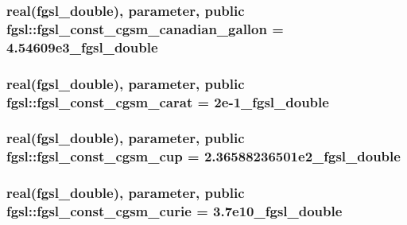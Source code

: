 \subsubsection[{fgsl\+\_\+const\+\_\+cgsm\+\_\+canadian\+\_\+gallon}]{\setlength{\rightskip}{0pt plus 5cm}real({\bf fgsl\+\_\+double}), parameter, public fgsl\+::fgsl\+\_\+const\+\_\+cgsm\+\_\+canadian\+\_\+gallon = 4.\+54609e3\+\_\+fgsl\+\_\+double}\label{namespacefgsl_a3a07299d97f40e47785e44126a457907}
\hypertarget{namespacefgsl_a239136f12feacdcaf3bc528ccb0c492f}{}
\subsubsection[{fgsl\+\_\+const\+\_\+cgsm\+\_\+carat}]{\setlength{\rightskip}{0pt plus 5cm}real({\bf fgsl\+\_\+double}), parameter, public fgsl\+::fgsl\+\_\+const\+\_\+cgsm\+\_\+carat = 2e-\/1\+\_\+fgsl\+\_\+double}\label{namespacefgsl_a239136f12feacdcaf3bc528ccb0c492f}
\hypertarget{namespacefgsl_aa3f891d5605128364396d3ae108b3d43}{}
\subsubsection[{fgsl\+\_\+const\+\_\+cgsm\+\_\+cup}]{\setlength{\rightskip}{0pt plus 5cm}real({\bf fgsl\+\_\+double}), parameter, public fgsl\+::fgsl\+\_\+const\+\_\+cgsm\+\_\+cup = 2.\+36588236501e2\+\_\+fgsl\+\_\+double}\label{namespacefgsl_aa3f891d5605128364396d3ae108b3d43}
\hypertarget{namespacefgsl_a1a2ad0a32e7001630dc57fb05a13896b}{}
\subsubsection[{fgsl\+\_\+const\+\_\+cgsm\+\_\+curie}]{\setlength{\rightskip}{0pt plus 5cm}real({\bf fgsl\+\_\+double}), parameter, public fgsl\+::fgsl\+\_\+const\+\_\+cgsm\+\_\+curie = 3.\+7e10\+\_\+fgsl\+\_\+double}\label{namespacefgsl_a1a2ad0a32e7001630dc57fb05a13896b}
\hypertarget{namespacefgsl_af34712504add6a207ec8e068ff61d8cd}{}
